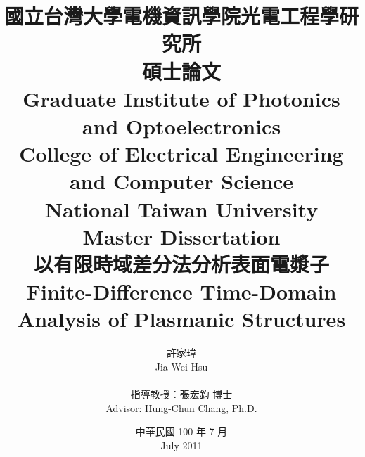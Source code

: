 \title{
  \kai 國立台灣大學電機資訊學院光電工程學研究所\\碩士論文\\
  \rm Graduate Institute of Photonics and Optoelectronics\\College of Electrical Engineering and Computer Science\\National Taiwan University\\Master Dissertation\\[1cm]
  \kai 以有限時域差分法分析表面電漿子\\
  \rm Finite-Difference Time-Domain Analysis of Plasmanic Structures
}

\author{
  \kai 許家瑋\\ \rm Jia-Wei Hsu\\\\
  \kai 指導教授：張宏鈞 博士\\ \rm Advisor: Hung-Chun Chang, Ph.D.
}

\date{
  \kai 中華民國 100 年 7 月\\ 
  \rm July 2011
}

\maketitle
{}
